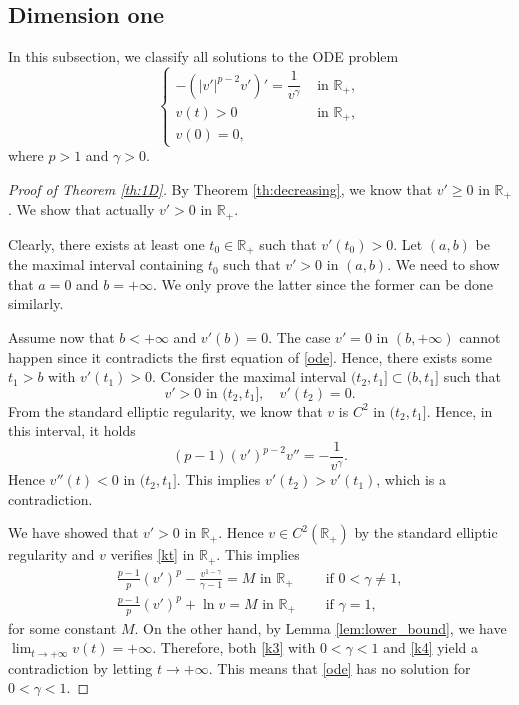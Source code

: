\documentclass[reqno]{amsart}
\theoremstyle{plain}
\theoremstyle{definition}
\theoremstyle{remark}
\begin{document}
	\subsection{Dimension one}
	
	In this subsection, we classify all solutions to the ODE problem
	\begin{equation}\label{ode}
		\begin{cases}
			-(|v'|^{p-2} v')' = \dfrac{1}{v^\gamma} & \text{ in } \mathbb{R}_+,\\
			v(t)>0 & \text{ in } \mathbb{R}_+,\\
			v(0)=0,
		\end{cases}
	\end{equation}
	where $p>1$ and $\gamma>0$.
	
	\begin{proof}[Proof of Theorem \ref{th:1D}]
		By Theorem \ref{th:decreasing}, we know that $v'\ge0$ in $\mathbb{R}_+$. We show that actually $v'>0$ in $\mathbb{R}_+$.
		
		Clearly, there exists at least one $t_0\in\mathbb{R}_+$ such that $v'(t_0)>0$. Let $(a,b)$ be the maximal interval containing $t_0$ such that $v'>0$ in $(a,b)$. We need to show that $a=0$ and $b=+\infty$. We only prove the latter since the former can be done similarly.
		
		Assume now that $b<+\infty$ and $v'(b)=0$. The case $v'=0$ in $(b,+\infty)$ cannot happen since it contradicts the first equation of \eqref{ode}. Hence, there exists some $t_1>b$ with $v'(t_1)>0$. Consider the maximal interval $(t_2,t_1] \subset (b, t_1]$ such that
		\[
		v' > 0 \text{ in } (t_2,t_1], \quad v'(t_2)=0.
		\]
		From the standard elliptic regularity, we know that $v$ is $C^2$ in $(t_2,t_1]$. Hence, in this interval, it holds
		\begin{equation}\label{kt}
			(p-1) (v')^{p-2} v'' = -\frac{1}{v^\gamma}.
		\end{equation}
		Hence $v''(t) < 0$ in $(t_2,t_1]$. This implies $v'(t_2) > v'(t_1)$, which is a contradiction.
		
		We have showed that $v'>0$ in $\mathbb{R}_+$. Hence $v\in C^2(\mathbb{R}_+)$ by the standard elliptic regularity and $v$ verifies \eqref{kt} in $\mathbb{R}_+$. This implies
		\begin{align}
			\frac{p-1}{p} (v')^p - \frac{v^{1-\gamma}}{\gamma-1} = M \text{ in } \mathbb{R}_+ &\quad\text{ if } 0<\gamma\ne1,\label{k3}\\
			\frac{p-1}{p} (v')^p + \ln v = M \text{ in } \mathbb{R}_+ &\quad\text{ if } \gamma=1,\label{k4}
		\end{align}
		for some constant $M$. On the other hand, by Lemma \ref{lem:lower_bound}, we have $\lim_{t\to+\infty}v(t)=+\infty$. Therefore, both \eqref{k3} with $0<\gamma<1$ and \eqref{k4} yield a contradiction by letting $t\to+\infty$. This means that \eqref{ode} has no solution for $0<\gamma<1$.
		

\end{proof}
\end{document}
